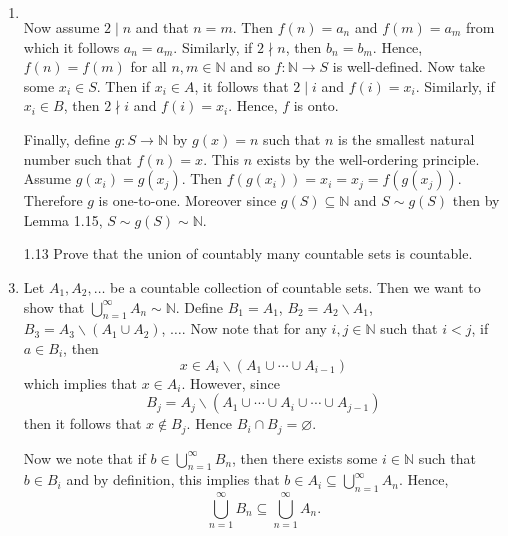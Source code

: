 \documentclass[12pt]{article}
\makeatletter
\theoremstyle{definition}
\theoremstyle{remark}
\renewenvironment{proof}[1][\proofname]{\par
  \pushQED{\qed}%
  \normalfont \topsep6\p@\@plus6\p@\relax
  \list{}{\leftmargin=0mm
          \rightmargin=4mm
          \settowidth{\itemindent}{\itshape#1}%
          \labelwidth=\itemindent
          \parsep=0pt \listparindent=\parindent 
  }
  \item[\hskip\labelsep
        \itshape
    #1\@addpunct{.}]\ignorespaces
}{%
  \popQED\endlist\@endpefalse
}
\let\oldproofname=\proofname
\renewcommand{\proofname}{\bf{\textit{\oldproofname}}}
\makeatother
\begin{document}
\begin{enumerate}[leftmargin=*]
\begin{proof}
\begin{align*}
                    \end{align*}
                Now assume $2\mid n$ and that $n=m$. Then $f(n)=a_{n}$ and $f(m)=a_{m}$ from which it follows $a_{n}=a_{m}$. Similarly, if $2\nmid n$, then $b_{n}=b_{m}$. Hence, $f(n)=f(m)$ for all $n,m\in\mathbb{N}$ and so $f\colon\mathbb{N}\rightarrow S$ is well-defined. Now take some $x_i\in S$. Then if $x_i\in A$, it follows that $2\mid i$ and  $f(i)=x_i$. Similarly, if $x_i\in B$, then $2\nmid i$ and $f(i)=x_i$. Hence, $f$ is onto.\par\hspace{4mm} Finally, define $g\colon S\rightarrow\mathbb{N}$ by $g(x)=n$ such that $n$ is the smallest natural number such that $f(n)=x$. This $n$ exists by the well-ordering principle. Assume $g(x_i)=g(x_j)$. Then $f(g(x_i))=x_i=x_j=f(g(x_j))$. Therefore $g$ is one-to-one. Moreover since $g(S)\subseteq\mathbb{N}$ and $S\sim g(S)$ then by Lemma 1.15, $S\sim g(S)\sim\mathbb{N}$.
            \end{proof}
        \item[1.13] Prove that the union of countably many countable sets is countable.
            \begin{proof}
                Let $A_1,A_2,\dots$ be a countable collection of countable sets. Then we want to show that $\bigcup_{n=1}^{\infty}A_n\sim\mathbb{N}$. Define $B_1=A_1$, $B_2=A_2\backslash A_1$, $B_3=A_3\backslash(A_1\cup A_2)$, $\dots$. Now note that for any $i,j\in\mathbb{N}$ such that $i<j$, if $a\in B_i$, then 
                    \begin{equation*}
                        x\in A_i\backslash(A_1\cup\cdots\cup A_{i-1})
                    \end{equation*}
                which implies that $x\in A_i$. However, since 
                    \begin{equation*}
                        B_j = A_j\backslash(A_1\cup\cdots\cup A_i\cup\cdots\cup A_{j-1})
                    \end{equation*}
                then it follows that $x\notin B_j$. Hence $B_i\cap B_j=\varnothing$.\par\hspace{4mm} Now we note that if $b\in\bigcup_{n=1}^{\infty} B_n$, then there exists some $i\in\mathbb{N}$ such that $b\in B_i$ and by definition, this implies that $b\in A_i\subseteq\bigcup_{n=1}^{\infty}A_n$. Hence, 
                    \begin{equation*}
                        \bigcup_{n=1}^{\infty}B_n\subseteq\bigcup_{n=1}^{\infty} A_n.

\end{equation*}
\end{proof}
\end{enumerate}
\end{document}
